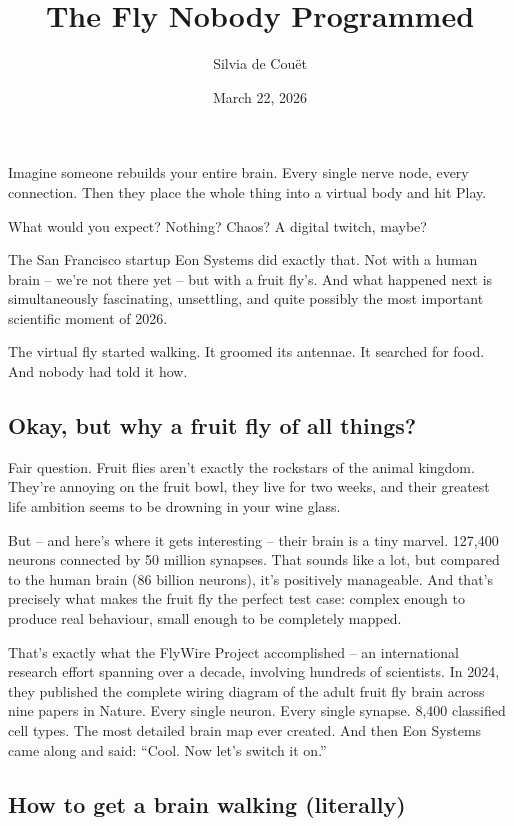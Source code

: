\documentclass[10pt,a4paper]{article}
\begin{document}
\title{The Fly Nobody Programmed}
\date{March 22, 2026}
\author{Silvia de Couët}
\maketitle

\setcounter{page}{1}
\linenumbers Imagine someone rebuilds your entire brain. Every single nerve node, every connection. Then they place the whole thing into a virtual body and hit Play.

What would you expect? Nothing? Chaos? A digital twitch, maybe?

The San Francisco startup Eon Systems did exactly that. Not with a human brain – we’re not there yet – but with a fruit fly’s. And what happened next is simultaneously fascinating, unsettling, and quite possibly the most important scientific moment of 2026.

The virtual fly started walking. It groomed its antennae. It searched for food. And nobody had told it how.
\subsection{Okay, but why a fruit fly of all things?}

Fair question. Fruit flies aren’t exactly the rockstars of the animal kingdom. They’re annoying on the fruit bowl, they live for two weeks, and their greatest life ambition seems to be drowning in your wine glass.

But – and here’s where it gets interesting – their brain is a tiny marvel. 127,400 neurons connected by 50 million synapses. That sounds like a lot, but compared to the human brain (86 billion neurons), it’s positively manageable. And that’s precisely what makes the fruit fly the perfect test case: complex enough to produce real behaviour, small enough to be completely mapped.

That’s exactly what the FlyWire Project accomplished – an international research effort spanning over a decade, involving hundreds of scientists. In 2024, they published the complete wiring diagram of the adult fruit fly brain across nine papers in Nature. Every single neuron. Every single synapse. 8,400 classified cell types. The most detailed brain map ever created. And then Eon Systems came along and said: “Cool. Now let’s switch it on.”

\subsection{How to get a brain walking (literally)}
\end{document}
